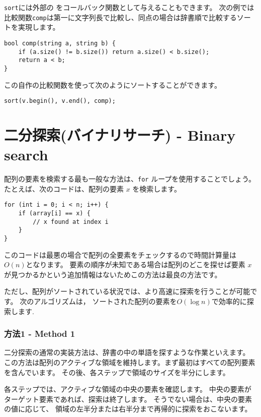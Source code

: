 \texttt{sort}には外部の
をコールバック関数として与えることもできます。
次の例では比較関数\texttt{comp}は第一に文字列長で比較し、同点の場合は辞書順で比較するソートを実現します。

\begin{lstlisting}
bool comp(string a, string b) {
    if (a.size() != b.size()) return a.size() < b.size();
    return a < b;
}
\end{lstlisting}
この自作の比較関数を使って次のようにソートすることができます。
\begin{lstlisting}
sort(v.begin(), v.end(), comp);
\end{lstlisting}

\section{二分探索(バイナリサーチ) - Binary search}


配列の要素を検索する最も一般な方法は、\texttt{for} ループを使用することでしょう。
たとえば、次のコードは、配列の要素 $x$ を検索します。

\begin{samepage}
\begin{lstlisting}
for (int i = 0; i < n; i++) {
    if (array[i] == x) {
        // x found at index i
    }
}
\end{lstlisting}
\end{samepage}
このコードは最悪の場合で配列の全要素をチェックするので時間計算量は$O(n)$となります。
要素の順序が未知である場合は配列のどこを探せば要素 $x$ が見つかるかという追加情報はないためこの方法は最良の方法です。

ただし、配列がソートされている状況では、より高速に探索を行うことが可能です。
次のアルゴリズムは，
ソートされた配列の要素を$O(\log n)$で効率的に探索します.

\subsubsection{方法1 - Method 1}

二分探索の通常の実装方法は、辞書の中の単語を探すような作業といえます。
この方法は配列のアクティブな領域を維持します。まず最初はすべての配列要素を含んでいます。
その後、各ステップで領域のサイズを半分にします。

各ステップでは、アクティブな領域の中央の要素を確認します。
中央の要素がターゲット要素であれば、探索は終了します。
そうでない場合は、中央の要素の値に応じて、
領域の左半分または右半分まで再帰的に探索をおこないます。

